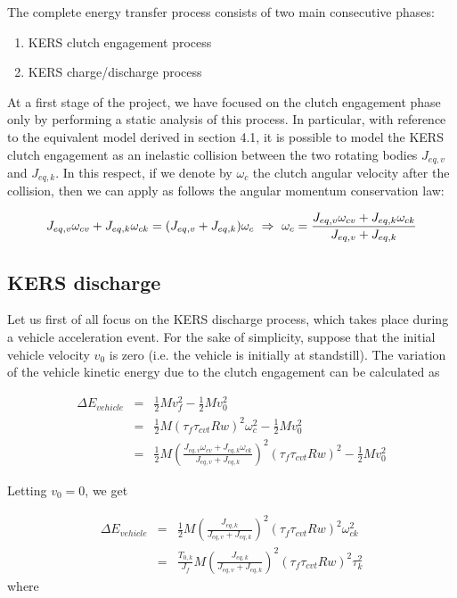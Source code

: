 \documentclass[11pt]{article}
\begin{document}
The complete energy transfer process consists of two main consecutive phases:

\begin{enumerate}
\item KERS clutch engagement process
\item KERS charge/discharge process
\end{enumerate}

At a first stage of the project, we have focused on the clutch engagement phase only by performing a static analysis of this process. In particular, with reference to the equivalent model derived in section 4.1, it is possible to model the KERS clutch engagement as an inelastic collision between the two rotating bodies $J_{eq,v}$ and $J_{eq,k}$. In this respect, if we denote by $\omega_c$ the clutch angular velocity after the collision, then we can apply as follows the angular momentum conservation law:

\begin{equation}
J_{eq,v}\omega_{cv}+J_{eq,k}\omega_{ck}=(J_{eq,v}+J_{eq,k})\omega_c\ \Rightarrow\ \omega_c= \frac{J_{eq,v}\omega_{cv}+J_{eq,k}\omega_{ck}}{J_{eq,v}+J_{eq,k}}\\
\end{equation}  

\subsection{KERS discharge}

Let us first of all focus on the KERS discharge process, which takes place during a vehicle acceleration event. For the sake of simplicity, suppose that the initial vehicle velocity $v_0$ is zero (i.e. the vehicle is initially at standstill). The variation of the vehicle kinetic energy due to the clutch engagement can be calculated as

\begin{eqnarray}
	\Delta E_{vehicle}&=&\frac{1}{2}Mv_f^2-\frac{1}{2}Mv_0^2\\
	                  &=&\frac{1}{2}M(\tau_f \tau_{cvt}Rw)^2\omega_c^2-\frac{1}							  {2}Mv_0^2\\
	                  &=&\frac{1}{2}M\left(\frac{J_{eq,v}\omega_{cv}+J_{eq,k}       					  \omega_{ck}}{J_{eq,v}+J_{eq,k}}\right)^2(\tau_f \tau_{cvt}						  Rw)^2-\frac{1}{2}Mv_0^2
\end{eqnarray}  

Letting $v_0=0$, we get

\begin{eqnarray}
\Delta E_{vehicle}&=&\frac{1}{2}M\left(\frac{J_{eq,k}}{J_{eq,v}+J_{eq,k}}								 \right)^2(\tau_f \tau_{cvt}Rw)^2\omega_{ck}^2\\
                  &=&\frac{T_{0,k}}{J_f}M\left(\frac{J_{eq,k}}{J_{eq,v}+J_{eq,k}}					     \right)^2(\tau_f \tau_{cvt}Rw)^2 \tau_k^2
\label{energy_vehicle}
\end{eqnarray}
where
\end{document}
